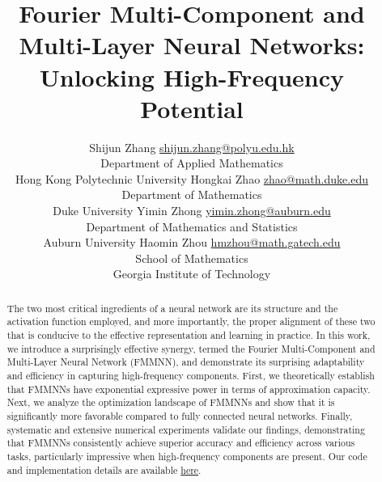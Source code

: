 \documentclass[11pt,a4paper]{article}
\title{Fourier Multi-Component and Multi-Layer Neural Networks: Unlocking High-Frequency Potential}
\author{\name   Shijun Zhang
\email  \href{mailto:shijun.zhang@polyu.edu.hk}{shijun.zhang@polyu.edu.hk}\\
\addr  Department of Applied Mathematics\\
Hong Kong Polytechnic University
\AND
\name  Hongkai Zhao
\email 
\href{mailto:zhao@math.duke.edu}{zhao@math.duke.edu}\\
\addr  Department of Mathematics\\
Duke University
\AND  \name  Yimin Zhong
\email \href{mailto:yimin.zhong@auburn.edu}{yimin.zhong@auburn.edu}
\\ 
\addr  Department of Mathematics and Statistics\\ Auburn University
\AND  \name  Haomin Zhou
\email  	\href{mailto:hmzhou@math.gatech.edu}{hmzhou@math.gatech.edu} 
\\
\addr School of Mathematics\\
 Georgia Institute of Technology
    }
\begin{document}
\maketitle



\begin{abstract}

The two most critical ingredients of a neural network are its structure and the activation function employed, and more importantly, the proper alignment of these two that is conducive to the effective representation and learning in practice.
In this work, we introduce a surprisingly effective synergy, termed the Fourier Multi-Component and Multi-Layer Neural Network (FMMNN), and demonstrate its surprising adaptability and efficiency in capturing high-frequency components. 
First, we theoretically establish that FMMNNs have exponential expressive power in terms of approximation capacity.  Next, we analyze the optimization landscape of FMMNNs and show that it is significantly more favorable compared to fully connected neural networks. Finally, systematic and extensive numerical experiments validate our findings, demonstrating that FMMNNs consistently achieve superior accuracy and efficiency across various tasks, particularly impressive when high-frequency components are present.  Our code and implementation details are available
\href{https://github.com/ShijunZhangMath/FMMNN}{here}.







\end{abstract}
\end{document}
